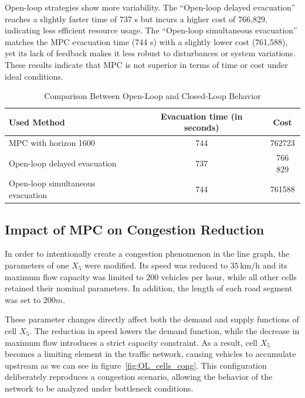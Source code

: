 \documentclass[12pt]{article}
\begin{document}
Open-loop strategies show more variability. The “Open-loop delayed evacuation” reaches a slightly faster time of 737 s but incurs a higher cost of 766,829, indicating less efficient resource usage. The “Open-loop simultaneous evacuation” matches the MPC evacuation time (744 s) with a slightly lower cost (761,588), yet its lack of feedback makes it less robust to disturbances or system variations. These results indicate that MPC is not superior in terms of time or cost under ideal conditions. 
\begin{table}[H]
    \centering
    \begin{tabularx}{\textwidth}{|X|c|c|}
        \hline
        \rowcolor{gray!20}
        Used Method & Evacuation time (in seconds) & Cost \\ \hline
        MPC with horizon 1600 & 744 & 762723 \\ \hline
        Open-loop delayed evacuation & 737 & 766 829 \\ \hline
        Open-loop simultaneous evacuation & 744 & 761588 \\ \hline
    \end{tabularx}
    \caption{Comparison Between Open-Loop and Closed-Loop Behavior}
    \label{tab:tableComparisonOL_MPC}
\end{table}

\subsection{Impact of MPC on Congestion Reduction}

In order to intentionally create a congestion phenomenon in the line graph,
the parameters of one $X_5$ were modified. Its speed was reduced to $35\,\mathrm{km/h}$ and its maximum flow capacity was limited to $200$ vehicles per hour, while all other cells retained
their nominal parameters. In addition, the length of each road segment was set
to $200m$.

These parameter changes directly affect both the demand and supply functions
of cell $X_5$. The reduction in speed lowers the demand function, while the
decrease in maximum flow introduces a strict capacity constraint. As a result,
cell $X_5$ becomes a limiting element in the traffic network, causing vehicles
to accumulate upstream as we can see in figure~\ref{fig:OL_cells_cong}. This configuration deliberately reproduces a
congestion scenario, allowing the behavior of the network to be analyzed under
bottleneck conditions.
\end{document}
